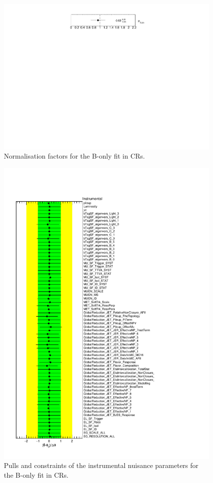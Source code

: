 \begin{figure}[!htbp]
	\centering
	\includegraphics[width=.6\textwidth]{Chapters/CH7/figures/BONLY_CR_UsingDL1rcFullSys/NormFactors}
	\caption{Normalisation factors for the B-only \tZc fit in CRs.}%
	\label{fig:stat:tzc:bonly:cr:norm}
\end{figure}

\restoregeometry
\begin{figure}[htbp]
	\centering
	\includegraphics[width=.8\textwidth]{Chapters/CH7/figures/BONLY_CR_UsingDL1rcFullSys/NuisPar_Instrumental}
	\caption{Pulls and constraints of the instrumental nuisance parameters for the B-only \tZc fit in CRs.}%
	\label{fig:stat:tzc:bonly:cr:np:instr}
\end{figure}

